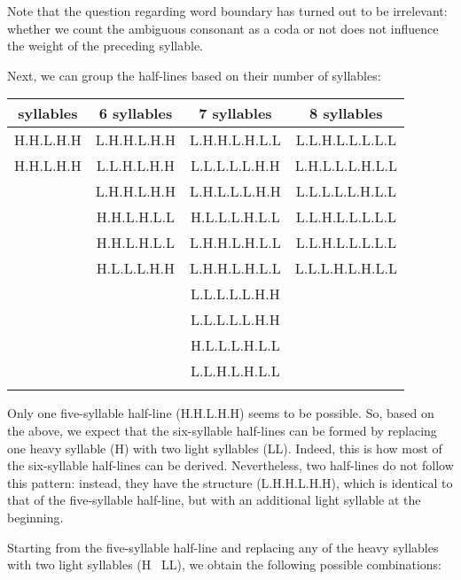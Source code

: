 \begin{refsection}
\begin{mysolution}
Note that the question regarding word boundary has turned out to be irrelevant: whether we count the ambiguous consonant as a coda or not does not influence the weight of the preceding syllable.

Next, we can group the half-lines based on their number of syllables:

\vfill
\begin{table}[H]
    \begin{tabular}{cccc}
    \lsptoprule
    5 syllables & 6 syllables & 7 syllables & 8 syllables\\
    \midrule
      H.H.L.H.H &  L.H.H.L.H.H & L.H.H.L.H.L.L &   L.L.H.L.L.L.L.L\\ 
      H.H.L.H.H &  L.L.H.L.H.H & L.L.L.L.L.H.H &   L.H.L.L.L.H.L.L\\ 
                &  L.H.H.L.H.H & L.H.L.L.L.H.H &   L.L.L.L.L.H.L.L\\ 
                &  H.H.L.H.L.L & H.L.L.L.H.L.L &   L.L.H.L.L.L.L.L\\ 
                &  H.H.L.H.L.L & L.H.H.L.H.L.L &   L.L.H.L.L.L.L.L\\ 
                &  H.L.L.L.H.H & L.H.H.L.H.L.L &   L.L.L.H.L.H.L.L\\
                &              & L.L.L.L.L.H.H &                  \\
                &              & L.L.L.L.L.H.H &                  \\
                &              & H.L.L.L.H.L.L &                  \\
                &              & L.L.H.L.H.L.L &                  \\
       \lspbottomrule
    \end{tabular}
\end{table}
\vfill\pagebreak

Only one five-syllable half-line (H.H.L.H.H) seems to be possible. So, based on the above, we expect that the six-syllable half-lines can be formed by replacing one heavy syllable (H) with two light syllables (LL). Indeed, this is how most of the six-syllable half-lines can be derived. Nevertheless, two half-lines do not follow this pattern: instead, they have the structure (L.H.H.L.H.H), which is identical to that of the five-syllable half-line, but with an additional light syllable at the beginning.

Starting from the five-syllable half-line and replacing any of the heavy syllables with two light syllables (H \textrightarrow\ LL), we obtain the following possible combinations:


\end{mysolution}
\end{refsection}
